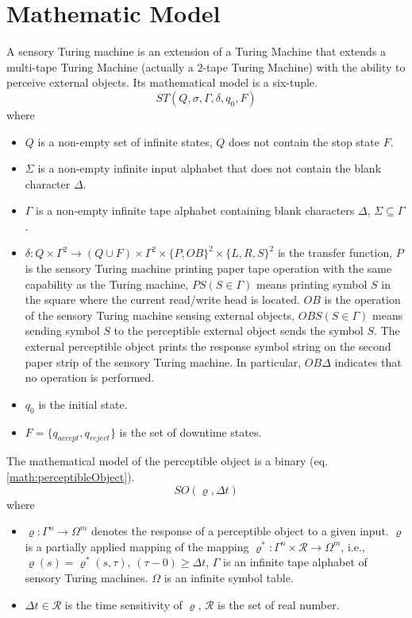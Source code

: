 \section{Mathematic Model}
A sensory Turing machine is an extension of a Turing Machine that extends a multi-tape Turing Machine (actually a 2-tape Turing Machine) with the ability to perceive external objects. Its mathematical model is a six-tuple.
\begin{equation}
    ST(Q, \sigma, \Gamma, \delta, q_0, F)
\end{equation}
where
\begin{itemize}
    \item $Q$ is a non-empty set of infinite states, $Q$ does not contain the stop state $F$.
    \item $\Sigma$ is a non-empty infinite input alphabet that does not contain the blank character $\Delta$.
    \item $\Gamma$ is a non-empty infinite tape alphabet containing blank characters $\Delta$, $\Sigma \subseteq \Gamma$.
    \item $\delta:Q\times\Gamma^2\to(Q\cup F)\times\Gamma^2\times\{P,OB\}^2\times\{L,R,S\}^2$ is the transfer function, $P$ is the sensory Turing machine printing paper tape operation with the same capability as the Turing machine, $PS(S\in\Gamma)$ means printing symbol $S$ in the square where the current read/write head is located. $OB$ is the operation of the sensory Turing machine sensing external objects, $OBS(S\in\Gamma)$ means sending symbol $S$ to the perceptible external object sends the symbol $S$. The external perceptible object prints the response symbol string on the second paper strip of the sensory Turing machine. In particular, $OB\Delta$ indicates that no operation is performed.
    \item $q_0$ is the initial state.
    \item $F = \{q_{accept}, q_{reject}\}$ is the set of downtime states.
\end{itemize}

The mathematical model of the perceptible object is a binary (eq. \ref{math:perceptibleObject}).
\begin{equation}\label{math:perceptibleObject}
    SO(\varrho,\Delta t) 
\end{equation}
where
\begin{itemize}
    \item $\varrho: \Gamma^n\to \Omega^m$ denotes the response of a perceptible object to a given input. $\varrho$ is a partially applied mapping of the mapping $\varrho^*:\Gamma^n\times \mathcal{R}\to\Omega^m$, i.e., $\varrho(s)=\varrho^* (s,\tau)$, $(\tau - 0 ) \geq \Delta t$, $\Gamma$ is an infinite tape alphabet of sensory Turing machines. $\Omega$ is an infinite symbol table.
    \item $\Delta t \in \mathcal{R}$ is the time sensitivity of $\varrho$, $\mathcal{R}$ is the set of real number.
\end{itemize}

